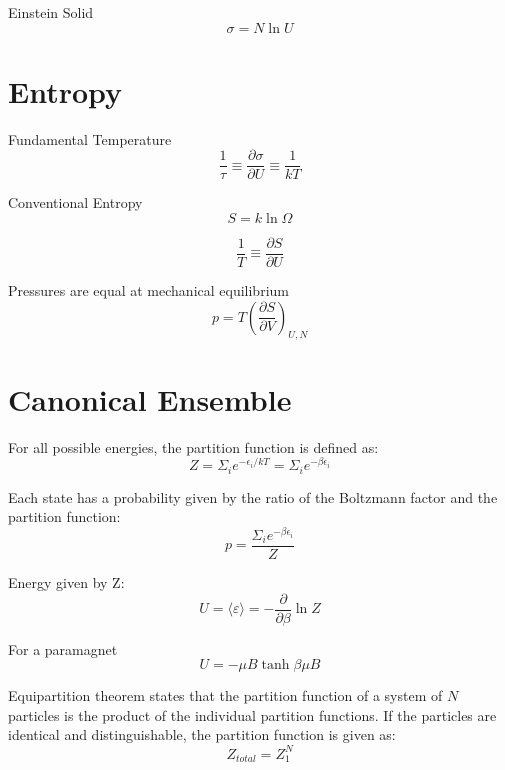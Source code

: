 \documentclass[11pt]{article}
\begin{document}
Einstein Solid
\begin{equation}
    \sigma = N \ln U
\end{equation}


\section{Entropy}
Fundamental Temperature
\begin{equation}
    \frac{1}{\tau} \equiv \frac{\partial \sigma}{\partial U} \equiv \frac{1}{kT}
\end{equation}

Conventional Entropy
\begin{equation}
    S = k \ln \Omega
\end{equation}

\begin{equation}
    \frac{1}{T} \equiv \frac{\partial S}{\partial U}
\end{equation}

Pressures are equal at mechanical equilibrium
\begin{equation}
    p = T \left( \frac{\partial S}{\partial V} \right)_{U,N}
\end{equation}


\section{Canonical Ensemble}
For all possible energies, the partition function is defined as:
\begin{equation}
    Z = \Sigma_i e^{-\epsilon_i/kT} = \Sigma_i e^{-\beta \epsilon_i}
\end{equation}

Each state has a probability given by the ratio of the Boltzmann factor and the partition function:
\begin{equation}
    p = \frac{\Sigma_i e^{-\beta \epsilon_i}}{Z}
\end{equation}

Energy given by Z:
\begin{equation}
    U = \langle \varepsilon \rangle = - \frac{\partial}{\partial \beta} \ln Z
\end{equation}

For a paramagnet
\begin{equation}
    U = -\mu B \tanh{\beta \mu B}
\end{equation}

Equipartition theorem states that the partition function of a system of $N$ particles is the product of the individual partition functions. If the particles are identical and distinguishable, the partition function is given as:
\begin{equation}
    Z_{total} = Z_1^N
\end{equation}
\end{document}
